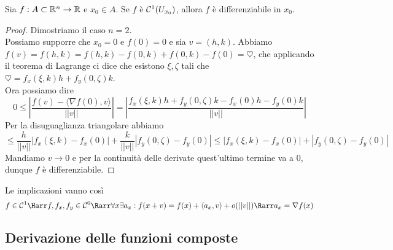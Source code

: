 \documentclass{article}
\begin{document}
\begin{theorem}{}{}
    Sia $f: A \subset \mathbb{R}^n \to \mathbb{R}$ e $x_0 \in A$. Se $f$ è $\mathcal{C}^1(U_{x_0})$, allora $f$ è differenziabile in $x_0$.
\end{theorem}
\begin{proof}
    Dimostriamo il caso $n=2$.\\
    Possiamo supporre che $x_0 = 0$ e $f(0)=0$ e sia $v = (h,k)$. Abbiamo $f(v) = f(h,k) = f(h,k) - f(0, k) + f(0, k) - f(0) = \heartsuit$, che applicando il teorema di Lagrange ci dice che esistono $\xi, \zeta$ tali che $\heartsuit = f_x(\xi,k)h + f_y(0,\zeta)k$.\\
    Ora possiamo dire
    \[0\le\left|\frac{f(v) - \langle \nabla f(0), v\rangle}{||v||}\right| = \left|\frac{f_x(\xi,k)h + f_y(0,\zeta)k - f_x(0)h - f_y(0)k}{||v||}\right|\]
    Per la disuguaglianza triangolare abbiamo
    \[ \le \frac{h}{||v||}|f_x(\xi,k) - f_x(0)| + \frac{k}{||v||}|f_y(0,\zeta) - f_y(0)| \le |f_x(\xi,k) - f_x(0)| +|f_y(0,\zeta) - f_y(0)|\]
    Mandiamo $v\to 0$ e per la continuità delle derivate quest'ultimo termine va a 0, dunque $f$ è differenziabile.
\end{proof}

\begin{remark}{}{}
    Le implicazioni vanno così
    \[f \in \mc{C}^1 \Harr f,f_x,f_y \in \mc{C}^0 \Rarr \forall x \exists a_x : f(x+v) = f(x) + \langle a_x, v\rangle + o(||v||) \Rarr a_x = \nabla f(x)\]
\end{remark}

\subsection{Derivazione delle funzioni composte}
\end{document}
